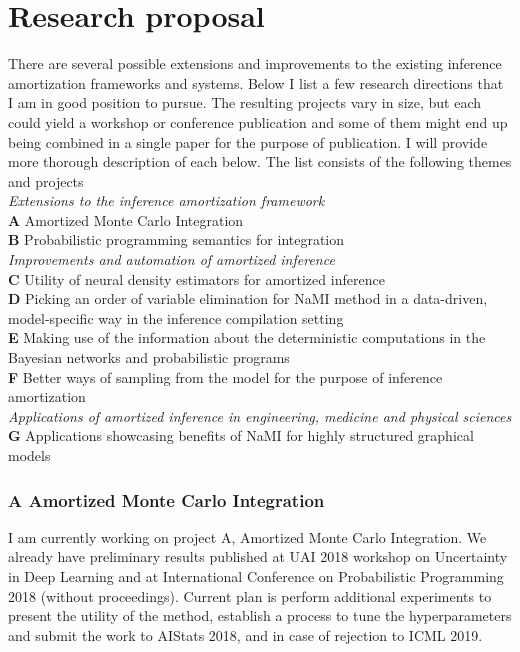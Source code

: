 \documentclass[12pt]{article}
\begin{document}
\section{Research proposal}
There are several possible extensions and improvements to the existing inference amortization frameworks and systems. 
Below I list a few research directions that I am in good position to pursue.
The resulting projects vary in size, but each could yield a workshop or conference publication and some of them might end up being combined in a single paper for the purpose of publication.
I will provide more thorough description of each below.
The list consists of the following themes and projects\\
\emph{Extensions to the inference amortization framework}\\
\textbf{A} \quad Amortized Monte Carlo Integration\\
\textbf{B} \quad Probabilistic programming semantics for integration\\
\emph{Improvements and automation of amortized inference}\\
\textbf{C} \quad Utility of neural density estimators for amortized inference\\
\textbf{D} \quad Picking an order of variable elimination for NaMI method in a data-driven, model-specific way in the inference compilation setting\\
\textbf{E} \quad Making use of the information about the deterministic computations in the Bayesian networks and probabilistic programs\\
\textbf{F} \quad Better ways of sampling from the model for the purpose of inference amortization\\
\emph{Applications of amortized inference in engineering, medicine and physical sciences}\\
\textbf{G} \quad Applications showcasing benefits of NaMI for highly structured graphical models\\




\subsubsection*{A \quad Amortized Monte Carlo Integration}
I am currently working on project A, Amortized Monte Carlo Integration. 
We already have preliminary results published at UAI 2018 workshop on Uncertainty in Deep Learning \citep{golinski2018uai} and at International Conference on Probabilistic Programming 2018 \citep{golinski2018probprog} (without proceedings).
Current plan is perform additional experiments to present the utility of the method, establish a process to tune the hyperparameters and submit the work to AIStats 2018, and in case of rejection to ICML 2019.
 
\end{document}
